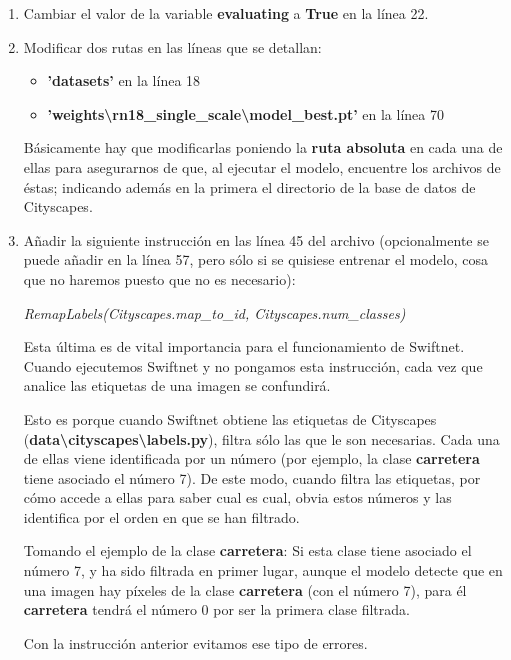 \begin{enumerate}
\item Cambiar el valor de la variable \textbf{evaluating} a \textbf{True} en la línea 22.
\item Modificar dos rutas en las líneas que se detallan:
\begin{itemize}
\item \textbf{'datasets'} en la línea 18
\item \textbf{'weights\textbackslash{rn18\_single\_scale}\textbackslash{model\_best.pt}'} en la línea 70
\end{itemize}

Básicamente hay que modificarlas poniendo la \textbf{ruta absoluta} en cada una de ellas para asegurarnos de que, al ejecutar el modelo, encuentre los archivos de éstas; indicando además en la primera el directorio de la base de datos de Cityscapes.

\item Añadir la siguiente instrucción en las línea 45 del archivo (opcionalmente se puede añadir en la línea 57, pero sólo si se quisiese entrenar el modelo, cosa que no haremos puesto que no es necesario):

\begin{center}
\textit{RemapLabels(Cityscapes.map\_to\_id, Cityscapes.num\_classes)}
\end{center}

Esta última es de vital importancia para el funcionamiento de Swiftnet. Cuando ejecutemos Swiftnet y no pongamos esta instrucción, cada vez que analice las etiquetas de una imagen se confundirá.

Esto es porque cuando Swiftnet obtiene las etiquetas de Cityscapes (\textbf{data\textbackslash{cityscapes}\textbackslash{labels.py}}), filtra sólo las que le son necesarias. Cada una de ellas viene identificada por un número (por ejemplo, la clase \textbf{carretera} tiene asociado el número 7). De este modo, cuando filtra las etiquetas, por cómo accede a ellas para saber cual es cual, obvia estos números y las identifica por el orden en que se han filtrado.

Tomando el ejemplo de la clase \textbf{carretera}: Si esta clase tiene asociado el número 7, y ha sido filtrada en primer lugar, aunque el modelo detecte que en una imagen hay píxeles de la clase \textbf{carretera} (con el número 7), para él \textbf{carretera} tendrá el número 0 por ser la primera clase filtrada.

Con la instrucción anterior evitamos ese tipo de errores.
\end{enumerate}

